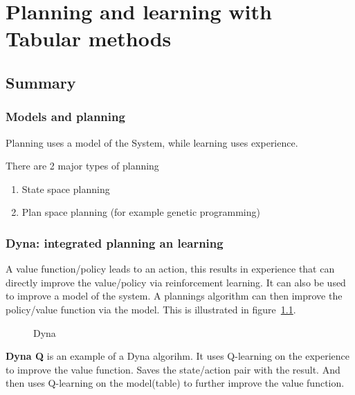 \chapter{Planning and learning with Tabular methods}
\section{Summary}

\subsection{Models and planning}
Planning uses a model of the System, while learning uses experience.

There are 2 major types of planning
\begin{enumerate}
	\item State space planning
	\item Plan space planning (for example genetic programming)
\end{enumerate}

\subsection{Dyna: integrated planning an learning}

A value function/policy leads to an action, this results in experience that can directly improve the value/policy via reinforcement learning. It can also be used to improve a model of the system. A plannings algorithm can then improve the policy/value function via the model. This is illustrated in figure~\ref{fig:dyna flow}.

\begin{figure}
\centering
{}
\caption{Dyna}
\label{fig:dyna flow}
\end{figure}

\textbf{Dyna Q} is an example of a Dyna algorihm. It uses Q-learning on the experience to improve the value function. Saves the state/action pair with the result. And then uses Q-learning on the model(table) to further improve the value function.


